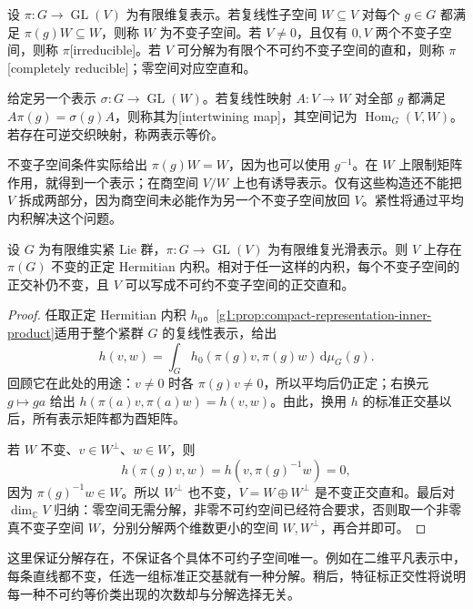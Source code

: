 \begin{definition}\label{g1:def:irreducible-intertwiner}
	设 \(\pi:G\to\operatorname{GL}(V)\) 为有限维复表示。若复线性子空间 \(W\subseteq V\) 对每个 \(g\in G\) 都满足 \(\pi(g)W\subseteq W\)，则称 \(W\) 为不变子空间。若 \(V\ne0\)，且仅有 \(0,V\) 两个不变子空间，则称 \(\pi\)[irreducible]。若 \(V\) 可分解为有限个不可约不变子空间的直和，则称 \(\pi\)[completely reducible]；零空间对应空直和。

	给定另一个表示 \(\sigma:G\to\operatorname{GL}(W)\)。若复线性映射 \(A:V\to W\) 对全部 \(g\) 都满足 \(A\pi(g)=\sigma(g)A\)，则称其为[intertwining map]，其空间记为 \(\operatorname{Hom}_G(V,W)\)。若存在可逆交织映射，称两表示等价。
\end{definition}

不变子空间条件实际给出 \(\pi(g)W=W\)，因为也可以使用 \(g^{-1}\)。在 \(W\) 上限制矩阵作用，就得到一个表示；在商空间 \(V/W\) 上也有诱导表示。仅有这些构造还不能把 \(V\) 拆成两部分，因为商空间未必能作为另一个不变子空间放回 \(V\)。紧性将通过平均内积解决这个问题。

\begin{proposition}\label{g1:prop:compact-unitarization-complete-reducibility}
	设 \(G\) 为有限维实紧 Lie 群，\(\pi:G\to\operatorname{GL}(V)\) 为有限维复光滑表示。则 \(V\) 上存在 \(\pi(G)\) 不变的正定 Hermitian 内积。相对于任一这样的内积，每个不变子空间的正交补仍不变，且 \(V\) 可以写成不可约不变子空间的正交直和。
\end{proposition}
\begin{proof}
	任取正定 Hermitian 内积 \(h_0\)。\cref{g1:prop:compact-representation-inner-product}适用于整个紧群 \(G\) 的复线性表示，给出
	\[
		h(v,w)=\int_G h_0(\pi(g)v,\pi(g)w)\,\mathrm{d}\mu_G(g).
	\]
	回顾它在此处的用途：\(v\ne0\) 时各 \(\pi(g)v\ne0\)，所以平均后仍正定；右换元 \(g\mapsto ga\) 给出 \(h(\pi(a)v,\pi(a)w)=h(v,w)\)。由此，换用 \(h\) 的标准正交基以后，所有表示矩阵都为酉矩阵。

	若 \(W\) 不变、\(v\in W^\perp\)、\(w\in W\)，则
	\[
		h(\pi(g)v,w)=h(v,\pi(g)^{-1}w)=0,
	\]
	因为 \(\pi(g)^{-1}w\in W\)。所以 \(W^\perp\) 也不变，\(V=W\oplus W^\perp\) 是不变正交直和。最后对 \(\dim_{\mathbb C}V\) 归纳：零空间无需分解，非零不可约空间已经符合要求，否则取一个非零真不变子空间 \(W\)，分别分解两个维数更小的空间 \(W,W^\perp\)，再合并即可。
\end{proof}

这里保证分解存在，不保证各个具体不可约子空间唯一。例如在二维平凡表示中，每条直线都不变，任选一组标准正交基就有一种分解。稍后，特征标正交性将说明每一种不可约等价类出现的次数却与分解选择无关。

